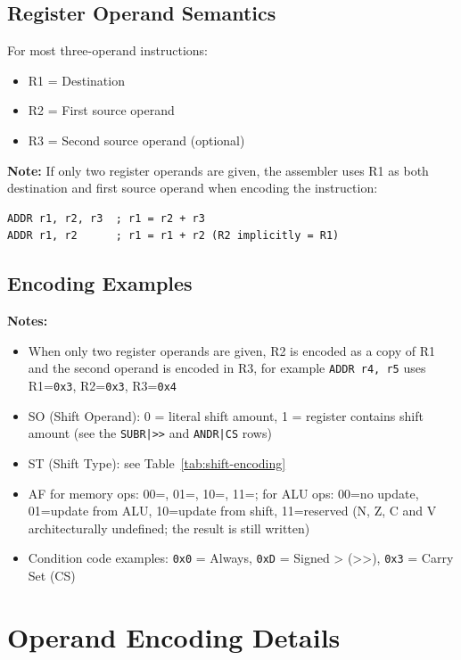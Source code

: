 \subsection{Register Operand Semantics}

For most three-operand instructions:
\begin{itemize}
	\item R1 = Destination
	\item R2 = First source operand
	\item R3 = Second source operand (optional)
\end{itemize}

\textbf{Note:} If only two register operands are given, the assembler uses R1 as both destination and
first source operand when encoding the instruction:

\begin{lstlisting}
ADDR r1, r2, r3  ; r1 = r2 + r3
ADDR r1, r2      ; r1 = r1 + r2 (R2 implicitly = R1)
\end{lstlisting}

\subsection{Encoding Examples}



\noindent\textbf{Notes:}
\begin{itemize}
	\item When only two register operands are given, R2 is encoded as a copy of R1 and the second operand is encoded in R3, for
	      example \texttt{ADDR r4, r5} uses R1=\texttt{0x3}, R2=\texttt{0x3}, R3=\texttt{0x4}
	\item SO (Shift Operand): 0 = literal shift amount, 1 = register contains shift amount (see the \texttt{SUBR|>>} and
	      \texttt{ANDR|CS} rows)
	\item ST (Shift Type): see Table~\ref{tab:shift-encoding}
	\item AF for memory ops: 00=, 01=, 10=, 11=; for ALU ops: 00=no update, 01=update from ALU,
	      10=update from shift, 11=reserved (N, Z, C and V architecturally undefined; the result is still written)
	\item Condition code examples: \texttt{0x0} = Always, \texttt{0xD} = Signed > (>>), \texttt{0x3} = Carry Set (CS)
\end{itemize}

\section{Operand Encoding Details}


